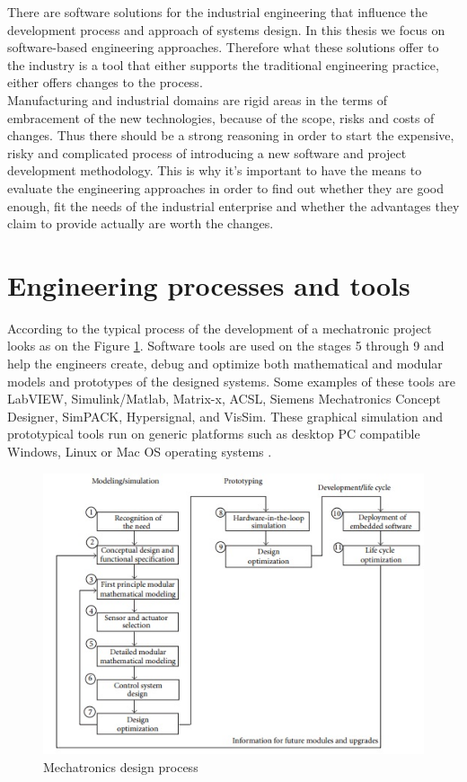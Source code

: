There are software solutions for the industrial engineering that influence the development process and approach of systems design. In this thesis we focus on software-based engineering approaches. Therefore what these solutions offer to the industry is a tool that either supports the traditional engineering practice, either offers changes to the process. \\

Manufacturing and industrial domains are rigid areas in the terms of embracement of the new technologies, because of the scope, risks and costs of changes. Thus there should be a strong reasoning in order to start the expensive, risky and complicated process of introducing a new software and project development methodology.
This is why it's important to have the means to evaluate the engineering approaches in order to find out whether they are good enough, fit the needs of the industrial enterprise and whether the advantages they claim to provide actually are worth the changes.  \\

  
\section{Engineering processes and tools}
According to \cite{kolk} the typical process of the development of a mechatronic project looks as on the Figure \ref{fig:mech_design}. Software tools are used on the stages 5 through 9 and help the engineers create, debug and optimize both mathematical and modular models and prototypes of the designed systems. Some examples of these tools are LabVIEW, Simulink/Matlab, Matrix-x, ACSL, Siemens Mechatronics Concept Designer, SimPACK, Hypersignal, and VisSim. These graphical simulation and prototypical tools run on generic platforms such as desktop PC compatible Windows, Linux or Mac OS operating systems \cite{shetty}.\\

 \begin{figure}[htb]
\includegraphics{figures/mech_design_process.jpg}
\caption{Mechatronics design process}
\label{fig:mech_design}
 \end{figure}

